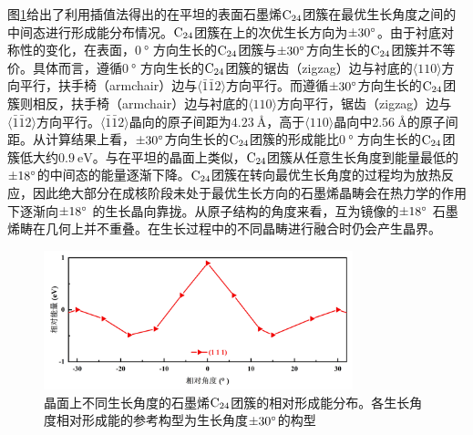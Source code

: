 图\ref{fig:GO_111_energy}给出了利用插值法得出的在平坦的表面石墨烯$\rm{C_{24}}$团簇在最优生长角度之间的中间态进行形成能分布情况。$\rm{C_{24}}$团簇在上的次优生长方向为$\SI{\pm 30}{\degree}$。由于衬底对称性的变化，在表面，$\SI{0}{\degree}$ 方向生长的$\rm{C_{24}}$团簇与$\SI{\pm 30}{\degree}$方向生长的$\rm{C_{24}}$团簇并不等价。具体而言，遵循$\SI{0}{\degree}$ 方向生长的$\rm{C_{24}}$团簇的锯齿（zigzag）边与衬底的$\langle 110\rangle$方向平行，扶手椅（armchair）边与$\langle\bar{1}\bar{1}2\rangle$方向平行。而遵循$\SI{\pm 30}{\degree}$方向生长的$\rm{C_{24}}$团簇则相反，扶手椅（armchair）边与衬底的$\langle 110\rangle$方向平行，锯齿（zigzag）边与$\langle\bar{1}\bar{1}2\rangle$方向平行。$\langle\bar{1}\bar{1}2\rangle$晶向的原子间距为$\SI{4.23}{\angstrom}$，高于$\langle 110\rangle$晶向中$\SI{2.56}{\angstrom}$的原子间距。从计算结果上看，$\SI{\pm 30}{\degree}$方向生长的$\rm{C_{24}}$团簇的形成能比$\SI{0}{\degree}$ 方向生长的$\rm{C_{24}}$团簇低大约$\SI{0.9}{\electronvolt}$。与在平坦的晶面上类似，$\rm{C_{24}}$团簇从任意生长角度到能量最低的$\SI{\pm 18 }{\degree}$的中间态的能量逐渐下降。$\rm{C_{24}}$团簇在转向最优生长角度的过程均为放热反应，因此绝大部分在成核阶段未处于最优生长方向的石墨烯晶畴会在热力学的作用下逐渐向$\SI{\pm 18}{\degree}$ 的生长晶向靠拢。从原子结构的角度来看，互为镜像的$\SI{\pm 18}{\degree}$ 石墨烯畴在几何上并不重叠。在生长过程中的不同晶畴进行融合时仍会产生晶界。

\begin{figure}[htb]
    \includegraphics[width=0.8\textwidth]{pic/GO_C24_flat_111_energy.png}
    \caption{晶面上不同生长角度的石墨烯$\rm{C_{24}}$团簇的相对形成能分布。各生长角度相对形成能的参考构型为生长角度$\SI{\pm 30}{\degree}$的构型}
    \label{fig:GO_111_energy}
\end{figure}

